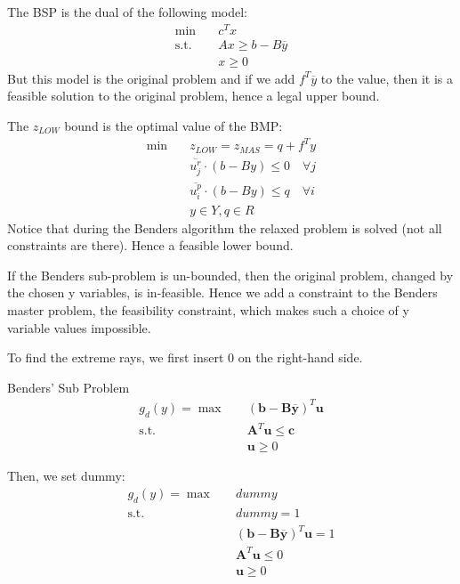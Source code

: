 \documentclass[fleqn,10pt]{wlscirep}
\begin{document}
The BSP is the dual of the following model:
\begin{align}
    \min \quad& c^T x \\
    \text{s.t.} \quad& A x \geq b - B \overline{y} \\ 
    & x \geq 0
\end{align}
But this model is the original problem and if we add $f^T \overline{y}$ to the value, then it is a feasible solution to the original problem, hence a legal upper bound.

The $z_{LOW}$ bound is the optimal value of the BMP:
\begin{align}
    \min \quad& z_{LOW} = z_{MAS} = q + f ^ { T } y \\
    \quad& \overline { u _ { j } ^ { r } } \cdot ( b - B y ) \leq 0 \quad \forall j \\ 
    & \overline { u _ { i } ^ { p } } \cdot ( b - B y ) \leq q \quad \forall i \\ 
    & y \in Y , q \in R
\end{align}
Notice that during the Benders algorithm the relaxed problem is solved (not all constraints are there). Hence a feasible lower bound.

If the Benders sub-problem is un-bounded, then the original problem, changed by the chosen y variables, is in-feasible. Hence we add a constraint to the Benders master problem, the feasibility constraint, which makes such a choice of y variable values impossible.

To find the extreme rays, we first insert 0 on the right-hand side.

Benders' Sub Problem
\begin{align}
    g_d(y) = \max \quad& (\mathbf{b} - \mathbf{B}\overline{\mathbf{y}})^{T} \mathbf{u} \\
    \text{s.t.} \quad& \mathbf{A}^{T} \mathbf{u} \leq \mathbf{c} \\ 
    & \mathbf{u} \geq 0
\end{align}

Then, we set dummy:
\begin{align}
	g_d(y) = \max \quad & dummy \\
    \text{s.t.} \quad & dummy = 1 \\
    &  (\mathbf{b} - \mathbf{B}\overline{\mathbf{y}})^{T} \mathbf{u}  = 1\\
    & \mathbf{A}^{T} \mathbf{u} \leq 0 \\ 
    & \mathbf{u} \geq 0
\end{align}
\end{document}
